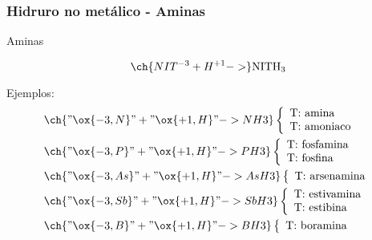 \subsubsection*{Hidruro no metálico - Aminas}
\begin{Theorem*} {Aminas}
	\begin{figure}[H]
		\centering
	\end{figure}
	$$\ch{NIT^{-3} + H^{+1} ->}\mathrm{NIT}\mathrm{H}_3$$
\end{Theorem*}
\noindent Ejemplos:
\begin{align*}
	&\ch{"\ox{-3,N}" + "\ox{+1,H}" -> NH3}\left\{\begin{array}{l}
		\text{T: amina}\\
		\text{T: amoniaco}
	\end{array}\right. \\
	&\ch{"\ox{-3,P}" + "\ox{+1,H}" -> PH3}\left\{\begin{array}{l}
		\text{T: fosfamina}\\
		\text{T: fosfina}
	\end{array}\right. \\
	&\ch{"\ox{-3,As}" + "\ox{+1,H}" -> AsH3}\left\{\begin{array}{l}
		\text{T: arsenamina}
	\end{array}\right. \\
	&\ch{"\ox{-3,Sb}" + "\ox{+1,H}" -> SbH3}\left\{\begin{array}{l}
		\text{T: estivamina}\\
		\text{T: estibina}
	\end{array}\right. \\
	&\ch{"\ox{-3,B}" + "\ox{+1,H}" -> BH3}\left\{\begin{array}{l}
		\text{T: boramina}
	\end{array}\right.
\end{align*}
